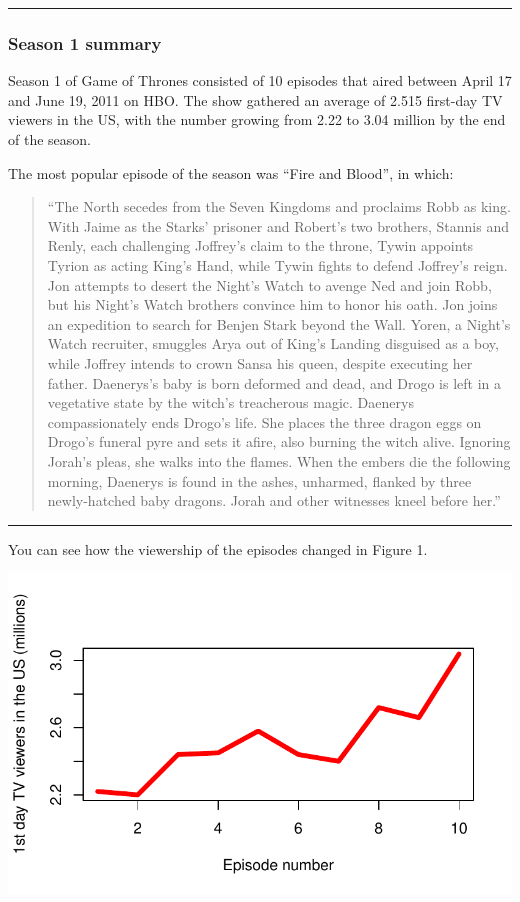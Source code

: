 \documentclass[
  letterpaper,
  DIV=11,
  numbers=noendperiod]{scrartcl}
\begin{document}
\begin{center}\rule{0.5\linewidth}{0.5pt}\end{center}

\hypertarget{season-1-summary}{%
\subsubsection{Season 1 summary}\label{season-1-summary}}

Season 1 of Game of Thrones consisted of 10 episodes that aired between
April 17 and June 19, 2011 on HBO. The show gathered an average of 2.515
first-day TV viewers in the US, with the number growing from 2.22 to
3.04 million by the end of the season.

The most popular episode of the season was ``Fire and Blood'', in which:

\begin{quote}
``The North secedes from the Seven Kingdoms and proclaims Robb as king.
With Jaime as the Starks' prisoner and Robert's two brothers, Stannis
and Renly, each challenging Joffrey's claim to the throne, Tywin
appoints Tyrion as acting King's Hand, while Tywin fights to defend
Joffrey's reign. Jon attempts to desert the Night's Watch to avenge Ned
and join Robb, but his Night's Watch brothers convince him to honor his
oath. Jon joins an expedition to search for Benjen Stark beyond the
Wall. Yoren, a Night's Watch recruiter, smuggles Arya out of King's
Landing disguised as a boy, while Joffrey intends to crown Sansa his
queen, despite executing her father. Daenerys's baby is born deformed
and dead, and Drogo is left in a vegetative state by the witch's
treacherous magic. Daenerys compassionately ends Drogo's life. She
places the three dragon eggs on Drogo's funeral pyre and sets it afire,
also burning the witch alive. Ignoring Jorah's pleas, she walks into the
flames. When the embers die the following morning, Daenerys is found in
the ashes, unharmed, flanked by three newly-hatched baby dragons. Jorah
and other witnesses kneel before her.''
\end{quote}

\begin{center}\rule{0.5\linewidth}{0.5pt}\end{center}

You can see how the viewership of the episodes changed in Figure 1.

\includegraphics{Assignment_files/figure-pdf/viewers_plot-1.pdf}
\end{document}
